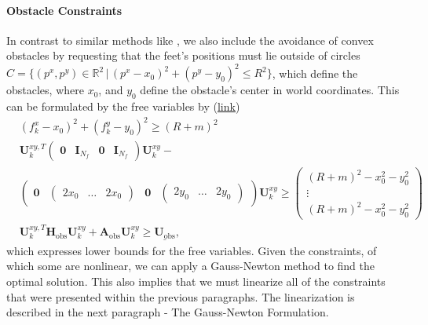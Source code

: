 \paragraph{Obstacle Constraints}
In contrast to similar methods like \cite{herdt2010walking}, we also include the avoidance of convex obstacles by requesting that the feet's positions must lie outside of circles $C = \{(p^x, p^y)\in\mathbb{R}^2 \,|\, (p^x-x_0)^2+(p^y-y_0)^2\leq R^2\}$, which define the obstacles, where $x_0$, and $y_0$ define the obstacle's center in world coordinates. This can be formulated by the free variables by (\href{https://github.com/mhubii/nmpc_pattern_generator/blob/dc1f5a9366cbbbf76f1b02cada642f6ac9a04c89/libs/pattern_generator/src/base_generator.cpp#L1271}{\underline{link}})
\begin{align}
	&(f_k^x-x_0)^2 + (f_k^y-y_0)^2 \geq (R + m)^2
	\label{eq::212_obstacle}\\
	&\bm{U}_k^{xy,T}\begin{pmatrix}
	\bm{0} & \textbf{I}_{N_f} & \bm{0}& \textbf{I}_{N_f}
	\end{pmatrix}\bm{U}_k^{xy} - \\&\begin{pmatrix}
	\bm{0} & \begin{pmatrix}
	2x_0 & \dots & 2x_0
	\end{pmatrix} & \bm{0} & \begin{pmatrix}
	2y_0 & \dots & 2y_0
	\end{pmatrix}
	\end{pmatrix} \bm{U}_k^{xy}\geq \begin{pmatrix}
	(R + m)^2-x_0^2-y_0^2 \\
	\vdots \\
	(R + m)^2-x_0^2-y_0^2
	\end{pmatrix}\\
	&\bm{U}_k^{xy,T}\bm{H}_{\text{obs}}\bm{U}_k^{xy}+\bm{A}_{\text{obs}}\bm{U}_k^{xy} \geq \underline{\bm{U}_{\text{obs}}},
\end{align}
which expresses lower bounds for the free variables. Given the constraints, of which some are nonlinear, we can apply a Gauss-Newton method to find the optimal solution. This also implies that we must linearize all of the constraints that were presented within the previous paragraphs. The linearization is described in the next paragraph - The Gauss-Newton Formulation.
\FloatBarrier

